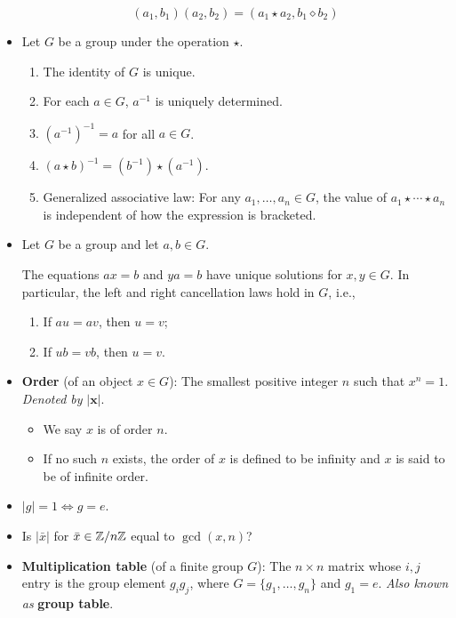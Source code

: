 \documentclass[../notes.tex]{subfiles}
\begin{document}
\begin{itemize}
\begin{equation*}
        (a_1,b_1)(a_2,b_2) = (a_1\star a_2,b_1\diamond b_2)
    \end{equation*}
    \item Let $G$ be a group under the operation $\star$.
    \begin{proposition}\leavevmode
        \begin{enumerate}[label={\textbf{\textup{(\arabic*)}}}]
            \item The identity of $G$ is unique.
            \item For each $a\in G$, $a^{-1}$ is uniquely determined.
            \item $(a^{-1})^{-1}=a$ for all $a\in G$.
            \item $(a\star b)^{-1}=(b^{-1})\star(a^{-1})$.
            \item Generalized associative law: For any $a_1,\dots,a_n\in G$, the value of $a_1\star\cdots\star a_n$ is independent of how the expression is bracketed.
        \end{enumerate}
    \end{proposition}
    \item Let $G$ be a group and let $a,b\in G$.
    \begin{proposition}
        The equations $ax=b$ and $ya=b$ have unique solutions for $x,y\in G$. In particular, the left and right cancellation laws hold in $G$, i.e.,
        \begin{enumerate}[label={\textbf{\textup{(\arabic*)}}}]
            \item If $au=av$, then $u=v$;
            \item If $ub=vb$, then $u=v$.
        \end{enumerate}
    \end{proposition}
    \item \textbf{Order} (of an object $x\in G$): The smallest positive integer $n$ such that $x^n=1$. \emph{Denoted by} $\bm{|x|}$.
    \begin{itemize}
        \item We say $x$ is of order $n$.
        \item If no such $n$ exists, the order of $x$ is defined to be infinity and $x$ is said to be of infinite order.
    \end{itemize}
    \item $|g|=1\Longleftrightarrow g=e$.
    \item Is $|\bar{x}|$ for $\bar{x}\in\mathbb{Z}/n\mathbb{Z}$ equal to $\gcd(x,n)$?
    \item \textbf{Multiplication table} (of a finite group $G$): The $n\times n$ matrix whose $i,j$ entry is the group element $g_ig_j$, where $G=\{g_1,\dots,g_n\}$ and $g_1=e$. \emph{Also known as} \textbf{group table}.
\end{itemize}
\end{document}
